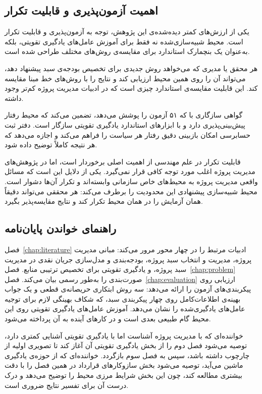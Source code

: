 \subsection{اهمیت آزمون‌پذیری و قابلیت تکرار}
\label{subsec:reproducibility}

یکی از ارزش‌های کمتر دیده‌شده‌ی این پژوهش، توجه به آزمون‌پذیری
و قابلیت تکرار است. محیط شبیه‌سازی‌شده نه فقط برای آموزش
عامل‌های یادگیری تقویتی، بلکه به‌عنوان یک بنچمارک استاندارد
برای مقایسه‌ی روش‌های مختلف طراحی شده است.

هر محقق یا مدیری که می‌خواهد روش جدیدی برای تخصیص بودجه‌ی سبد
پیشنهاد دهد، می‌تواند آن را روی همین محیط ارزیابی کند و نتایج را
با روش‌های خط مبنا مقایسه کند. این قابلیت مقایسه‌ی استاندارد
چیزی است که در ادبیات مدیریت پروژه کم‌تر وجود داشته.

گواهی سازگاری با  که ۵۱ آزمون را پوشش می‌دهد،
تضمین می‌کند که محیط رفتار پیش‌بینی‌پذیری دارد و با ابزارهای
استاندارد یادگیری تقویتی سازگار است. دفتر ثبت حسابرسی 
امکان بازبینی دقیق رفتار هر سیاست را فراهم می‌کند و اجازه
می‌دهد که هر نتیجه کاملاً توضیح داده شود.

قابلیت تکرار در علم مهندسی از اهمیت اصلی برخوردار است، اما در
پژوهش‌های مدیریت پروژه اغلب مورد توجه کافی قرار نمی‌گیرد. یکی
از دلایل این است که مسائل واقعی مدیریت پروژه به محیط‌های خاص
سازمانی وابسته‌اند و تکرار آن‌ها دشوار است. محیط شبیه‌سازی پیشنهادی
این محدودیت را برطرف می‌کند: هر محققی می‌تواند دقیقاً همان
آزمایش را در همان محیط تکرار کند و نتایج مقایسه‌پذیر بگیرد.

\subsection{راهنمای خواندن پایان‌نامه}
\label{subsec:reading_guide}

فصل~\ref{chap:literature} ادبیات مرتبط را در چهار محور مرور می‌کند:
مبانی مدیریت پروژه، مدیریت و انتخاب سبد پروژه، بودجه‌بندی و
مدل‌سازی جریان نقدی در مدیریت سبد پروژه، و یادگیری تقویتی برای
تخصیص ترتیبی منابع.
فصل~\ref{chap:problem} صورت‌بندی  را به‌طور رسمی بیان
می‌کند.
فصل~\ref{chap:evaluation} ارزیابی روی پیکربندی‌های آزمون را ارائه
می‌دهد: سه روش ابتکاری حریصانه‌ی قطعی و یک جواب بهینه‌ی
اطلاعات‌کامل روی چهار پیکربندی سبد، که شکاف بهینگی لازم برای
توجیه عامل‌های یادگیری‌شده را نشان می‌دهد.
آموزش عامل‌های یادگیری تقویتی روی این محیط گام طبیعی بعدی است و
در کارهای آینده به آن پرداخته می‌شود.

خواننده‌ای که با مدیریت پروژه آشناست اما با یادگیری تقویتی آشنایی
کمتری دارد، توصیه می‌شود فصل دوم را از بخش یادگیری تقویتی آن آغاز
کند تا تصویری اولیه از چارچوب داشته باشد، سپس به فصل سوم بازگردد.
خواننده‌ای که از حوزه‌ی یادگیری ماشین می‌آید، توصیه می‌شود بخش
سازوکارهای قرارداد در همین فصل را با دقت بیشتری مطالعه کند، چون
این بخش شرایط مرزی محیط را توضیح می‌دهد و درک درست آن برای
تفسیر نتایج ضروری است.